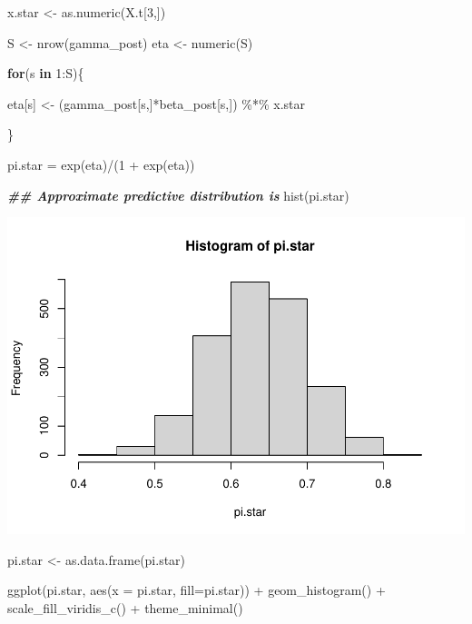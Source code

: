 \documentclass[
]{article}
\newenvironment{Shaded}{\begin{snugshade}}{\end{snugshade}}
\newcommand{\AttributeTok}[1]{\textcolor[rgb]{0.77,0.63,0.00}{#1}}
\newcommand{\ControlFlowTok}[1]{\textcolor[rgb]{0.13,0.29,0.53}{\textbf{#1}}}
\newcommand{\DecValTok}[1]{\textcolor[rgb]{0.00,0.00,0.81}{#1}}
\newcommand{\DocumentationTok}[1]{\textcolor[rgb]{0.56,0.35,0.01}{\textbf{\textit{#1}}}}
\newcommand{\FunctionTok}[1]{\textcolor[rgb]{0.00,0.00,0.00}{#1}}
\newcommand{\NormalTok}[1]{#1}
\newcommand{\OtherTok}[1]{\textcolor[rgb]{0.56,0.35,0.01}{#1}}
\newcommand{\SpecialCharTok}[1]{\textcolor[rgb]{0.00,0.00,0.00}{#1}}
\begin{document}
\begin{Shaded}
\begin{Highlighting}[]
\NormalTok{x.star }\OtherTok{\textless{}{-}} \FunctionTok{as.numeric}\NormalTok{(X.t[}\DecValTok{3}\NormalTok{,])}

\NormalTok{S }\OtherTok{\textless{}{-}} \FunctionTok{nrow}\NormalTok{(gamma\_post)}
\NormalTok{eta }\OtherTok{\textless{}{-}} \FunctionTok{numeric}\NormalTok{(S)}

\ControlFlowTok{for}\NormalTok{(s }\ControlFlowTok{in} \DecValTok{1}\SpecialCharTok{:}\NormalTok{S)\{}
  
\NormalTok{  eta[s] }\OtherTok{\textless{}{-}}\NormalTok{ (gamma\_post[s,]}\SpecialCharTok{*}\NormalTok{beta\_post[s,]) }\SpecialCharTok{\%*\%}\NormalTok{ x.star}
  
\NormalTok{\}}

\NormalTok{pi.star }\OtherTok{=} \FunctionTok{exp}\NormalTok{(eta)}\SpecialCharTok{/}\NormalTok{(}\DecValTok{1} \SpecialCharTok{+} \FunctionTok{exp}\NormalTok{(eta))}

\DocumentationTok{\#\# Approximate predictive distribution is}
\FunctionTok{hist}\NormalTok{(pi.star)}
\end{Highlighting}
\end{Shaded}

\includegraphics{bmp_main_files/figure-latex/unnamed-chunk-7-1.pdf}

\begin{Shaded}
\begin{Highlighting}[]
\NormalTok{pi.star }\OtherTok{\textless{}{-}} \FunctionTok{as.data.frame}\NormalTok{(pi.star)}

\FunctionTok{ggplot}\NormalTok{(pi.star, }\FunctionTok{aes}\NormalTok{(}\AttributeTok{x =}\NormalTok{ pi.star, }\AttributeTok{fill=}\NormalTok{pi.star)) }\SpecialCharTok{+} \FunctionTok{geom\_histogram}\NormalTok{() }\SpecialCharTok{+} \FunctionTok{scale\_fill\_viridis\_c}\NormalTok{() }\SpecialCharTok{+} \FunctionTok{theme\_minimal}\NormalTok{()}
\end{Highlighting}
\end{Shaded}
\end{document}
